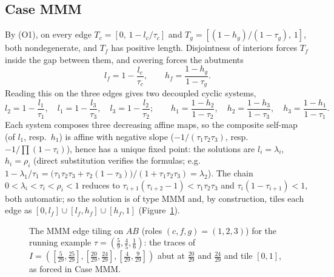 \documentclass[11pt,reqno]{amsart}
\theoremstyle{plain}
\theoremstyle{definition}
\theoremstyle{remark}
\begin{document}
\subsection*{Case MMM}
By (O1), on every edge $T_c=[0,\,1-l_c/\tau_c]$ and
$T_g=[(1-h_g)/(1-\tau_g),\,1]$, both nondegenerate, and $T_f$ has positive
length. Disjointness of interiors forces $T_f$ inside the gap between them, and
covering forces the abutments
\[
l_f=1-\frac{l_c}{\tau_c},\qquad h_f=\frac{1-h_g}{1-\tau_g}.
\]
Reading this on the three edges gives two decoupled cyclic systems,
\[
l_2=1-\frac{l_1}{\tau_1},\quad l_1=1-\frac{l_3}{\tau_3},\quad
l_3=1-\frac{l_2}{\tau_2};
\qquad
h_1=\frac{1-h_2}{1-\tau_2},\quad h_2=\frac{1-h_3}{1-\tau_3},\quad
h_3=\frac{1-h_1}{1-\tau_1}.
\]
Each system composes three decreasing affine maps, so the composite self-map
(of $l_1$, resp.\ $h_1$) is affine with negative slope
($-1/(\tau_1\tau_2\tau_3)$, resp.\ $-1/\prod(1-\tau_i)$), hence has a unique
fixed point: the solutions are $l_i=\lambda_i$, $h_i=\rho_i$ (direct
substitution verifies the formulas; e.g.\
$1-\lambda_1/\tau_1
=\bigl(\tau_1\tau_2\tau_3+\tau_2(1-\tau_3)\bigr)/(1+\tau_1\tau_2\tau_3)
=\lambda_2$). The chain
$0<\lambda_i<\tau_i<\rho_i<1$ reduces to
$\tau_{i+1}(\tau_{i+2}-1)<\tau_1\tau_2\tau_3$ and $\tau_i(1-\tau_{i+1})<1$,
both automatic; so the solution is of type MMM and, by construction, tiles each
edge as $[0,l_f]\cup[l_f,h_f]\cup[h_f,1]$ (Figure~\ref{fig:tiling}).

\begin{figure}[ht]
\centering
{}
\caption{The MMM edge tiling on $AB$ (roles $(c,f,g)=(1,2,3)$) for the running
example $\tau=(\tfrac59,\tfrac45,\tfrac16)$: the traces of
$I=([\tfrac5{29},\tfrac{25}{29}],[\tfrac{20}{29},\tfrac{24}{29}],
[\tfrac4{29},\tfrac9{29}])$ abut at $\tfrac{20}{29}$ and $\tfrac{24}{29}$ and
tile $[0,1]$, as forced in Case MMM.}
\label{fig:tiling}
\end{figure}
\end{document}
